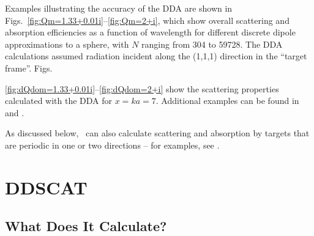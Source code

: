 Examples illustrating the accuracy of the DDA are shown in 
Figs.\ \ref{fig:Qm=1.33+0.01i}--\ref{fig:Qm=2+i}, which show overall
scattering and absorption efficiencies as a function of wavelength for
different discrete dipole approximations to a sphere, with $N$ ranging
from 304 to 59728.
The DDA calculations assumed radiation incident along the (1,1,1)
direction in the ``target frame''.
Figs.\ {\ref{fig:dQdom=1.33+0.01i}--\ref{fig:dQdom=2+i} show the scattering
properties calculated with the DDA for $x=ka=7$.
Additional examples can be found in \citet{Draine+Flatau_1994} and 
\citet{Draine_2000a}.

As discussed below,
\ddscatv\ can also calculate scattering and absorption by targets that
are periodic in one or two directions -- for examples, see
\citet{Draine+Flatau_2008a}.


\section{DDSCAT \vers\label{sec:DDSCATvers}}
\subsection{ What Does It Calculate?}

}
